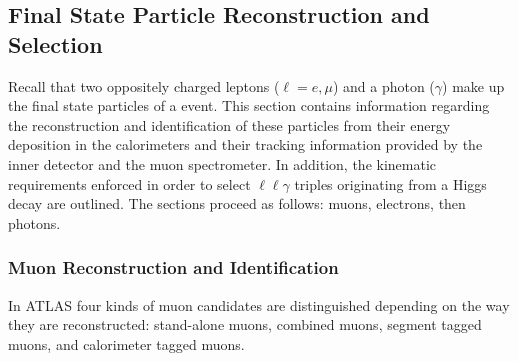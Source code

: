 \subsection{Final State Particle Reconstruction and Selection}
Recall that two oppositely charged leptons ($\ell = e, \mu$) and a photon ($\gamma$)
make up the final state particles of a \HToZg event. This section
contains information regarding the reconstruction and identification of these 
particles from their energy deposition in the calorimeters and their tracking
information provided by the inner detector and the muon spectrometer.
In addition, the kinematic requirements enforced in order to select $\ell\ell\gamma$
triples originating from a Higgs decay are outlined. The sections proceed
as follows: muons, electrons, then photons.

\subsubsection*{Muon Reconstruction and Identification}
In ATLAS four kinds of muon candidates are distinguished depending on the
way they are reconstructed: stand-alone muons, combined muons, segment tagged muons,
and calorimeter tagged muons\cite{ATLAS-CONF-2010-064}.
